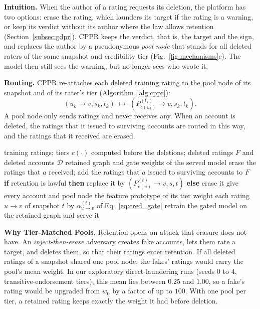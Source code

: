 \documentclass[lettersize,journal]{IEEEtran}
\begin{document}
\noindent\textbf{Intuition.}
When the author of a rating requests its deletion, the platform has two options: erase the rating, which launders its target if the rating is a warning, or keep its verdict without its author where the law allows retention (Section~\ref{subsec:gdpr}).
CPPR keeps the verdict, that is, the target and the sign, and replaces the author by a pseudonymous \emph{pool node} that stands for all deleted raters of the same snapshot and credibility tier (Fig.~\ref{fig:mechanisms}c).
The model then still sees the warning, but no longer sees who wrote it.

\smallskip\noindent\textbf{Routing.}
CPPR re-attaches each deleted training rating to the pool node of its snapshot and of its rater's tier (Algorithm~\ref{alg:cppr}):
\begin{equation}
\label{eq:cp_vpe}
(u_k \to v, s_k, t_k) \;\longmapsto\; (P^{(t_k)}_{c(u_k)} \to v, s_k, t_k).
\end{equation}
A pool node only sends ratings and never receives any.
When an account is deleted, the ratings that it issued to surviving accounts are routed in this way, and the ratings that it received are erased.

\begin{algorithm}[!t]
\caption{CPPR: serving a batch of deletion requests}
\label{alg:cppr}
\footnotesize
\begin{algorithmic}[1]
\Require training ratings; tiers $c(\cdot)$ computed before the deletions; deleted ratings $F$ and deleted accounts $\mathcal{D}$
\Ensure retained graph and gate weights of the served model
  \State erase the ratings that $a$ received; add the ratings that $a$ issued to surviving accounts to $F$
\EndFor
{}
  \State \textbf{if} retention is lawful \textbf{then} replace it by $(P^{(t)}_{c(u)} \to v, s, t)$ \textbf{else} erase it
\EndFor
\State give every account and pool node the feature prototype of its tier
\State weight each rating $u \to v$ of snapshot $t$ by $\alpha^{(t)}_{u \to v}$ of Eq.~\eqref{eq:cred_gate}
\State retrain the gated model on the retained graph and serve it
\end{algorithmic}
\end{algorithm}

\smallskip\noindent\textbf{Why Tier-Matched Pools.}
Retention opens an attack that erasure does not have.
An \emph{inject-then-erase} adversary creates fake accounts, lets them rate a target, and deletes them, so that their ratings enter retention.
If all deleted ratings of a snapshot shared one pool node, the fakes' ratings would carry the pool's mean weight. In our exploratory direct-laundering runs (seeds $0$ to $4$, transitive-endorsement tiers), this mean lies between $0.25$ and $1.00$, so a fake's rating would be upgraded from $w_0$ by a factor of up to $100$.
With one pool per tier, a retained rating keeps exactly the weight it had before deletion.
\end{document}
